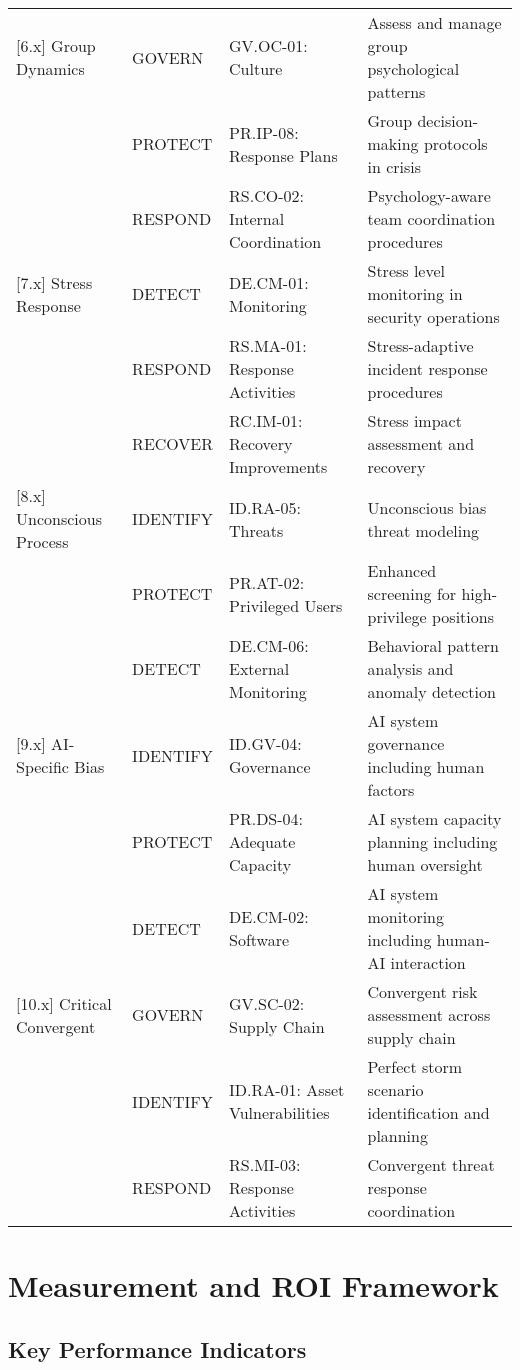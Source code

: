 \documentclass[11pt,a4paper]{article}
\begin{document}
\begin{longtable}{p{2.5cm}p{4cm}p{4cm}p{4.5cm}}
[6.x] Group Dynamics & GOVERN & GV.OC-01: Culture & Assess and manage group psychological patterns \\
 & PROTECT & PR.IP-08: Response Plans & Group decision-making protocols in crisis \\
 & RESPOND & RS.CO-02: Internal Coordination & Psychology-aware team coordination procedures \\

[7.x] Stress Response & DETECT & DE.CM-01: Monitoring & Stress level monitoring in security operations \\
 & RESPOND & RS.MA-01: Response Activities & Stress-adaptive incident response procedures \\
 & RECOVER & RC.IM-01: Recovery Improvements & Stress impact assessment and recovery \\

[8.x] Unconscious Process & IDENTIFY & ID.RA-05: Threats & Unconscious bias threat modeling \\
 & PROTECT & PR.AT-02: Privileged Users & Enhanced screening for high-privilege positions \\
 & DETECT & DE.CM-06: External Monitoring & Behavioral pattern analysis and anomaly detection \\

[9.x] AI-Specific Bias & IDENTIFY & ID.GV-04: Governance & AI system governance including human factors \\
 & PROTECT & PR.DS-04: Adequate Capacity & AI system capacity planning including human oversight \\
 & DETECT & DE.CM-02: Software & AI system monitoring including human-AI interaction \\

[10.x] Critical Convergent & GOVERN & GV.SC-02: Supply Chain & Convergent risk assessment across supply chain \\
 & IDENTIFY & ID.RA-01: Asset Vulnerabilities & Perfect storm scenario identification and planning \\
 & RESPOND & RS.MI-03: Response Activities & Convergent threat response coordination \\
\end{longtable}

\section{Measurement and ROI Framework}

\subsection{Key Performance Indicators}
\end{document}
